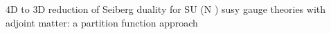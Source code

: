 \begin{titlepage}
	\begin{center}
	\vspace*{1cm}
	\Huge
	4D to 3D reduction of Seiberg duality for
	SU (N ) susy gauge theories with adjoint
	matter: a partition function approach



	\end{center}
\end{titlepage}